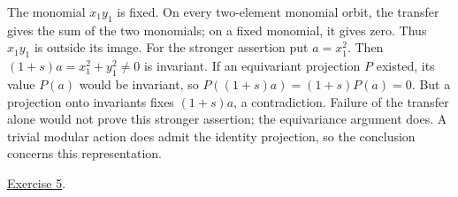 \documentclass[
]{article}
\begin{document}
The monomial \(x_1y_1\) is fixed. On every two-element monomial orbit,
the transfer gives the sum of the two monomials; on a fixed monomial, it
gives zero. Thus \(x_1y_1\) is outside its image. For the stronger
assertion put \(a=x_1^2\). Then \((1+s)a=x_1^2+y_1^2\ne0\) is invariant.
If an equivariant projection \(P\) existed, its value \(P(a)\) would be
invariant, so \(P((1+s)a)=(1+s)P(a)=0\). But a projection onto
invariants fixes \((1+s)a\), a contradiction. Failure of the transfer
alone would not prove this stronger assertion; the equivariance argument
does. A trivial modular action does admit the identity projection, so
the conclusion concerns this representation.

\hyperref[exercise-5]{Exercise 5}.
\end{document}
